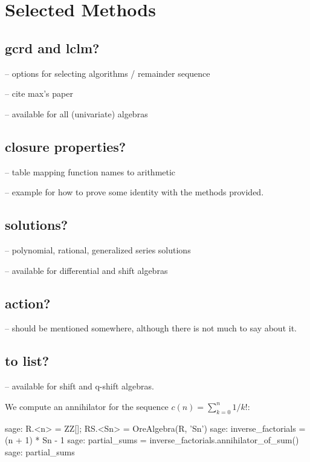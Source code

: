 \documentclass{amsart}
\begin{document}
\section{Selected Methods}\label{sec:4}

\subsection{gcrd and lclm?}

-- options for selecting algorithms / remainder sequence

-- cite max's paper

-- available for all (univariate) algebras

\subsection{closure properties?}

-- table mapping function names to arithmetic

-- example for how to prove some identity with the methods provided. 

\subsection{solutions?}

-- polynomial, rational, generalized series solutions

-- available for differential and shift algebras

\subsection{action?}

-- should be mentioned somewhere, although there is not much to say about it. 

\subsection{to list?}

-- available for shift and q-shift algebras. 

We compute an annihilator for the sequence
$c(n) = \sum_{k=0}^n 1 / k!$:

\begin{sageexample}
  sage: R.<n> = ZZ[]; RS.<Sn> = OreAlgebra(R, 'Sn')
  sage: inverse_factorials = (n + 1) * Sn - 1
  sage: partial_sums = inverse_factorials.annihilator_of_sum()
  sage: partial_sums
\end{sageexample}
\end{document}
